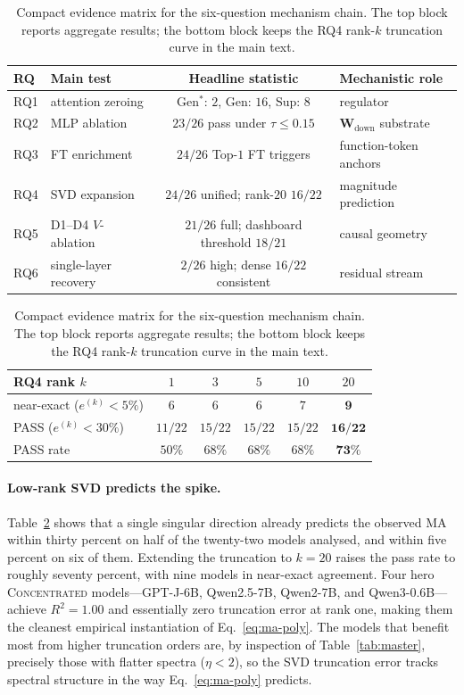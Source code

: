 \documentclass{article}
\newcommand{\Wdown}{\mathbf{W}_{\text{down}}}
\begin{document}
\begin{table}[t]
  \caption{Compact evidence matrix for the six-question mechanism chain.
  The top block reports aggregate results; the bottom block keeps the RQ4
  rank-$k$ truncation curve in the main text.}
  \label{tab:polyfit}
  \centering
  \scriptsize
  \setlength{\tabcolsep}{4pt}
  \renewcommand{\arraystretch}{0.9}
  \begin{tabular}{@{}l l c l@{}}
    \toprule
    RQ & Main test & Headline statistic & Mechanistic role \\
    \midrule
    RQ1 & attention zeroing & Gen$^{*}$: $2$, Gen: $16$, Sup: $8$ & regulator \\
    RQ2 & MLP ablation & $23/26$ pass under $\tau \leq 0.15$ & $\Wdown$ substrate \\
    RQ3 & FT enrichment & $24/26$ Top-$1$ FT triggers & function-token anchors \\
    RQ4 & SVD expansion & $24/26$ unified; rank-$20$ $16/22$ & magnitude prediction \\
    RQ5 & D1--D4 $V$-ablation & $21/26$ full; dashboard threshold $18/21$ & causal geometry \\
    RQ6 & single-layer recovery & $2/26$ high; dense $16/22$ consistent & residual stream \\
    \bottomrule
  \end{tabular}

  \vspace{2pt}
  \begin{tabular}{@{}l c c c c c@{}}
    \toprule
    RQ4 rank $k$ & $1$ & $3$ & $5$ & $10$ & $20$ \\
    \midrule
    near-exact ($e^{(k)}<5\%$) & $6$ & $6$ & $6$ & $7$ & $\mathbf{9}$ \\
    PASS ($e^{(k)}<30\%$) & $11/22$ & $15/22$ & $15/22$ & $15/22$ & $\mathbf{16/22}$ \\
    PASS rate & $50\%$ & $68\%$ & $68\%$ & $68\%$ & $\mathbf{73\%}$ \\
    \bottomrule
  \end{tabular}
\end{table}

\paragraph{Low-rank SVD predicts the spike.}
Table~\ref{tab:polyfit} shows that a single singular direction already
predicts the observed MA within thirty percent on half of the
twenty-two models analysed, and within five percent on six of them.
Extending the truncation to $k{=}20$ raises the pass rate to roughly
seventy percent, with nine models in near-exact agreement. Four hero
\textsc{Concentrated} models---GPT-J-6B, Qwen2.5-7B, Qwen2-7B, and
Qwen3-0.6B---achieve $R^{2} = 1.00$ and essentially zero truncation
error at rank one, making them the cleanest empirical instantiation of
Eq.~\eqref{eq:ma-poly}. The models that benefit most from higher
truncation orders are, by inspection of Table~\ref{tab:master},
precisely those with flatter spectra ($\eta < 2$), so the SVD
truncation error tracks spectral structure in the way
Eq.~\eqref{eq:ma-poly} predicts.
\end{document}
